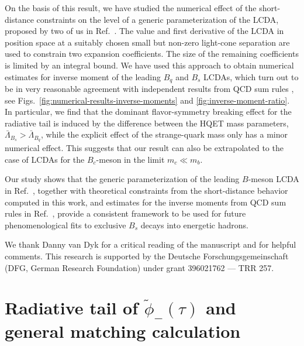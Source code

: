 \documentclass[a4paper,11pt]{article}
\begin{document}
On the basis of this result, we have studied the numerical effect of the short-distance constraints on the level of a generic
parameterization of the LCDA, proposed by two of us in Ref.~\cite{Feldmann:2022uok}. The value and first derivative of the LCDA in
position space at a suitably chosen small but non-zero light-cone separation are used to constrain two expansion coefficients.
The size of the remaining coefficients is limited by an integral bound. We have used this approach to obtain numerical estimates
for inverse moment of the leading $B_q$ and $B_s$ LCDAs, which turn out to be in very reasonable agreement with independent
results from QCD sum rules \cite{Khodjamirian:2020hob}, see Figs.~\ref{fig:numerical-results-inverse-moments} and \ref{fig:inverse-moment-ratio}.
In particular, we find that the dominant flavor-symmetry breaking effect for the radiative tail is induced by the difference
between the HQET mass parameters, $\bar\Lambda_{B_s} > \bar \Lambda_{B_q}$, while the explicit effect of the strange-quark mass 
only has a minor numerical effect. This suggests that our result can also be extrapolated to the case of LCDAs for the $B_c$-meson in the limit $m_c \ll m_b$.

Our study shows that the generic parameterization of the leading $B$-meson LCDA in Ref.~\cite{Feldmann:2022uok}, 
together with theoretical constraints from the short-distance behavior computed in this work, and 
estimates for the inverse moments from QCD sum rules in Ref.~\cite{Khodjamirian:2020hob}, provide a 
consistent framework to be used for future phenomenological fits to exclusive $B_s$ decays into energetic hadrons.


\acknowledgments

We thank Danny van Dyk for a critical reading of the manuscript and for helpful comments. This research is supported by the Deutsche Forschungsgemeinschaft (DFG, German Research Foundation) under grant 396021762 --- TRR 257. 


\clearpage 

\appendix 


\section{Radiative tail of \texorpdfstring{$\tilde \phi_-(\tau)$}{phi-} and general matching calculation}

\label{sec:radiative-tail}
\end{document}
